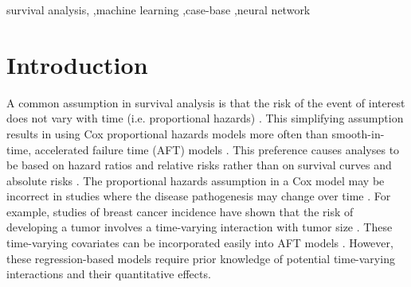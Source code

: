 \documentclass[preprint,12pt]{elsarticle}
\begin{document}
\begin{frontmatter}
\begin{keyword}
survival analysis, \sep machine learning \sep case-base \sep neural network
\end{keyword}

\end{frontmatter}



\hypertarget{introduction}{%
\section{Introduction}\label{introduction}}





A common assumption in survival analysis is that the risk of the event of interest does not vary with
time (i.e. proportional hazards) \citep{hanley2009}. This simplifying assumption results in using Cox proportional
hazards models more often than smooth-in-time, accelerated failure time (AFT) models \citep{hanley2009}. This
preference causes analyses to be based on hazard ratios and relative risks rather than on survival curves and
absolute risks \citep{hanley2009}. The proportional hazards assumption in a Cox model may be incorrect in studies
where the disease pathogenesis may change over time \citep{coradini2000time}. For example, studies of breast cancer
incidence have shown that the risk of developing a tumor involves a time-varying interaction with tumor size
\citep{coradini2000time}. These time-varying covariates can be incorporated easily into AFT models \citep{royston2002flexible}.
However, these regression-based models require prior knowledge of potential
time-varying interactions and their quantitative effects.
\end{document}
